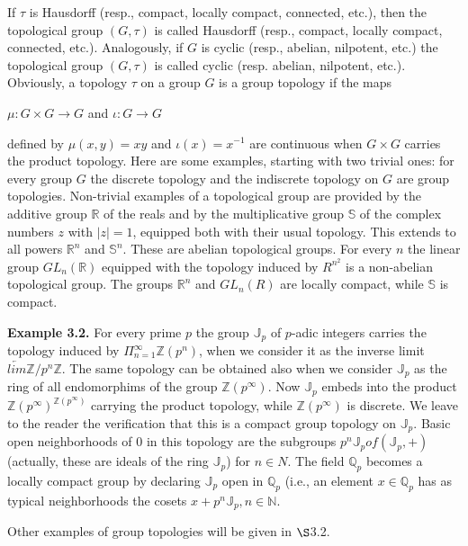 \documentclass[12pt]{article}
\begin{document}
    If $ \tau $ is Hausdorff (resp., compact, locally compact, connected, etc.), then the topological group $ (G, \tau) $ is
called Hausdorff (resp., compact, locally compact, connected, etc.). Analogously, if $ G $ is cyclic (resp., abelian,
nilpotent, etc.) the topological group $ (G, \tau) $ is called cyclic (resp. abelian, nilpotent, etc.). Obviously, a topology
$ \tau $ on a group $ G $ is a group topology if the maps 


$ \mu : G\times G \to G $ and $\iota : G \to G$


defined by $ \mu(x, y) = xy $ and $ \iota(x) = x^{-1} $ are continuous when $ G \times G $ carries the product topology.
Here are some examples, starting with two trivial ones: for every group $ G $ the discrete topology and the
indiscrete topology on $ G $ are group topologies. Non-trivial examples of a topological group are provided by the
additive group $ \mathbb{R} $ of the reals and by the multiplicative group $ \mathbb{S} $ of the complex numbers $ z $ with $ |z| = 1 $, equipped
both with their usual topology. This extends to all powers $ \mathbb{R}^n $ and $ \mathbb{S}^n$. These are abelian topological groups.
For every $ n $ the linear group $GL_n (\mathbb{R})$ equipped with the topology induced by $R^{n^2}$ is a non-abelian topological
group. The groups $\mathbb{R}^n$ and $GL_n (R)$ are locally compact, while $\mathbb{S}$ is compact.


\textbf{Example 3.2.} For every prime $ p $ the group $\mathbb{J}_p$ of $p$-adic integers carries the topology induced by $ \Pi^{\infty}_{n=1} \mathbb{Z}(p^n) $,
when we consider it as the inverse limit $\underleftarrow{lim} \mathbb{Z}/p^n \mathbb{Z}$. The same topology can be obtained also when we consider $\mathbb{J}_p$
as the ring of all endomorphims of the group $\mathbb{Z}(p^{\infty})$. Now $\mathbb{J}_p$ embeds into the product $\mathbb{Z}(p^{\infty})^{\mathbb{Z}(p^{\infty})}$ carrying the
product topology, while $\mathbb{Z}(p^{\infty})$ is discrete. We leave to the reader the verification that this is a compact group
topology on $\mathbb{J}_p$. Basic open neighborhoods of 0 in this topology are the subgroups $ p^n \mathbb{J}_p of (\mathbb{J}_p, +) $ (actually,
these are ideals of the ring $\mathbb{J}_p$) for $n \in N$. The field $\mathbb{Q}_p$ becomes a locally compact group by declaring $\mathbb{J}_p$ open
in $\mathbb{Q}_p$ (i.e., an element $x \in \mathbb{Q}_p$ has as typical neighborhoods the cosets $x + p^n \mathbb{J}_p, n \in \mathbb{N}$.


    Other examples of group topologies will be given in $\S$3.2.
\end{document}
